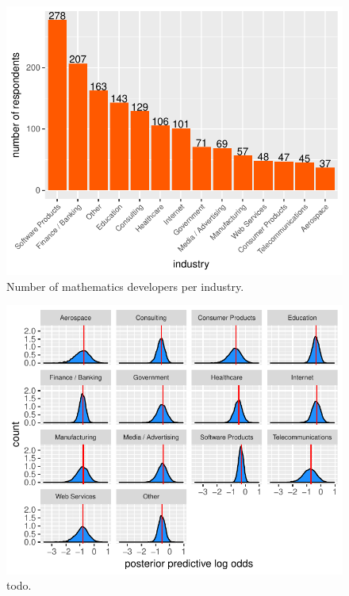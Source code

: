\documentclass{article}
\begin{document}
\begin{figure}[H]
\centering
\includegraphics{report-031}
\caption{Number of mathematics developers per industry.}\label{fig_9}
\end{figure}





\begin{figure}[H]
\centering
\includegraphics{report-036}
\caption{todo.}\label{fig_10}
\end{figure}
\end{document}

